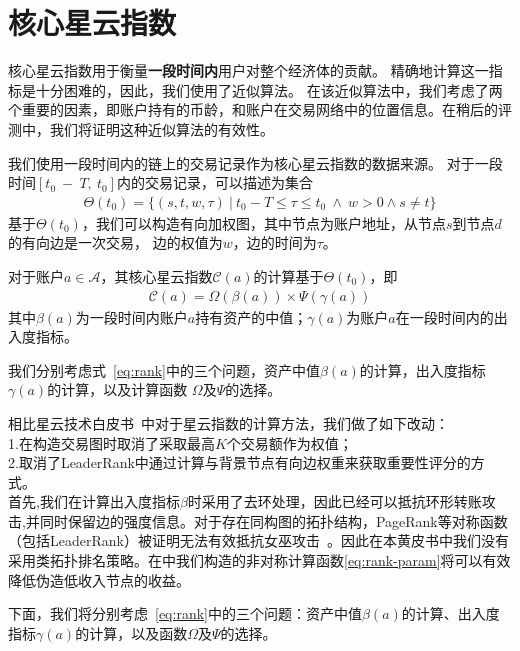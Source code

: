 \section{核心星云指数}

核心星云指数用于衡量{\textbf{一段时间内}}用户对整个经济体的贡献。
精确地计算这一指标是十分困难的，因此，我们使用了近似算法。
在该近似算法中，我们考虑了两个重要的因素，即账户持有的币龄，和账户在交易网络中的位置信息。在稍后的评测中，我们将证明这种近似算法的有效性。


我们使用一段时间内的链上的交易记录作为核心星云指数的数据来源。
对于一段时间$[t_0\ −\ T,\ t_0]$内的交易记录，可以描述为集合
\begin{align}
\Theta(t_0) = \{(s, t, w, \tau)\ |\ t_0 - T \le \tau \le t_0\ \land \ w > 0 \land s \neq t \}
\end{align}
\noindent 基于$\Theta(t_0)$，我们可以构造有向加权图，其中节点为账户地址，从节点$s$到节点$d$的有向边是一次交易，
边的权值为$w$，边的时间为$\tau$。


对于账户$a \in \mathcal{A}$，其核心星云指数$\mathcal{C}(a)$的计算基于$\Theta(t_0)$，即
\begin{align}
\mathcal{C}(a) = \Omega(\beta(a)) \times{} \Psi(\gamma(a))
\label{eq:rank}
\end{align}
\noindent 其中$\beta(a)$为一段时间内账户$a$持有资产的中值；$\gamma(a)$为账户$a$在一段时间内的出入度指标。

我们分别考虑式~\ref{eq:rank}中的三个问题，资产中值$\beta(a)$的计算，出入度指标$\gamma(a)$的计算，以及计算函数
$\Omega$及$\Psi$的选择。


{\color{red}相比星云技术白皮书~\cite{Nabulas}中对于星云指数的计算方法，我们做了如下改动：\\
1.在构造交易图时取消了采取最高$K$个交易额作为权值；\\
2.取消了LeaderRank中通过计算与背景节点有向边权重来获取重要性评分的方式。\\
首先,我们在计算出入度指标$\beta$时采用了去环处理，因此已经可以抵抗环形转账攻击,并同时保留边的强度信息。对于存在同构图的拓扑结构，PageRank等对称函数（包括LeaderRank）被证明无法有效抵抗女巫攻击~\cite{cheng2005sybilproof}。因此在本黄皮书中我们没有采用类拓扑排名策略。在中我们构造的非对称计算函数\ref{eq:rank-param}将可以有效降低伪造低收入节点的收益。}

下面，我们将分别考虑~\ref{eq:rank}中的三个问题：资产中值$\beta(a)$的计算、出入度指标$\gamma(a)$的计算，以及函数$\Omega$及$\Psi$的选择。


